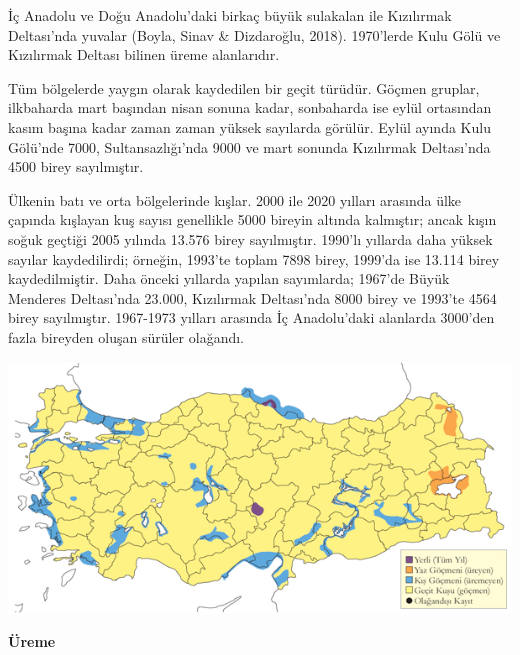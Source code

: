 \documentclass[
  a4paper,
  DIV=11,
  numbers=noendperiod]{scrreprt}
\begin{document}
İç Anadolu ve Doğu Anadolu'daki birkaç büyük sulakalan ile Kızılırmak
Deltası'nda yuvalar (Boyla, Sinav \& Dizdaroğlu, 2018). 1970'lerde Kulu
Gölü ve Kızılırmak Deltası bilinen üreme alanlarıdır.

Tüm bölgelerde yaygın olarak kaydedilen bir geçit türüdür. Göçmen
gruplar, ilkbaharda mart başından nisan sonuna kadar, sonbaharda ise
eylül ortasından kasım başına kadar zaman zaman yüksek sayılarda
görülür. Eylül ayında Kulu Gölü'nde 7000, Sultansazlığı'nda 9000 ve mart
sonunda Kızılırmak Deltası'nda 4500 birey sayılmıştır.

Ülkenin batı ve orta bölgelerinde kışlar. 2000 ile 2020 yılları arasında
ülke çapında kışlayan kuş sayısı genellikle 5000 bireyin altında
kalmıştır; ancak kışın soğuk geçtiği 2005 yılında 13.576 birey
sayılmıştır. 1990'lı yıllarda daha yüksek sayılar kaydedilirdi; örneğin,
1993'te toplam 7898 birey, 1999'da ise 13.114 birey kaydedilmiştir. Daha
önceki yıllarda yapılan sayımlarda; 1967'de Büyük Menderes Deltası'nda
23.000, Kızılırmak Deltası'nda 8000 birey ve 1993'te 4564 birey
sayılmıştır. 1967-1973 yılları arasında İç Anadolu'daki alanlarda
3000'den fazla bireyden oluşan sürüler olağandı.

\includegraphics{images/harita_Page_017.png}

\textbf{Üreme}
\end{document}
